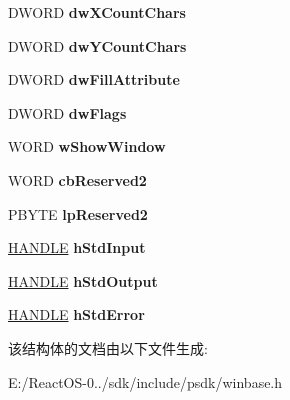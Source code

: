 \begin{DoxyCompactItemize}
\mbox{\label{struct___s_t_a_r_t_u_p_i_n_f_o_a_a339d012760b443363218eb43809c3feb}} 
D\+W\+O\+RD {\bfseries dw\+X\+Count\+Chars}
\item 
\mbox{\label{struct___s_t_a_r_t_u_p_i_n_f_o_a_a8fa7ef82e7b3ec0ef430a8b3e0e966ee}} 
D\+W\+O\+RD {\bfseries dw\+Y\+Count\+Chars}
\item 
\mbox{\label{struct___s_t_a_r_t_u_p_i_n_f_o_a_af7df2cda3673cf5d30e62340d99eb24e}} 
D\+W\+O\+RD {\bfseries dw\+Fill\+Attribute}
\item 
\mbox{\label{struct___s_t_a_r_t_u_p_i_n_f_o_a_a528647d3eb202072f508079f5a5a1cf9}} 
D\+W\+O\+RD {\bfseries dw\+Flags}
\item 
\mbox{\label{struct___s_t_a_r_t_u_p_i_n_f_o_a_a76de742c6711d4965344d1c51a2493fe}} 
W\+O\+RD {\bfseries w\+Show\+Window}
\item 
\mbox{\label{struct___s_t_a_r_t_u_p_i_n_f_o_a_ac437ec76176bbd4daf3ed1aa38c67513}} 
W\+O\+RD {\bfseries cb\+Reserved2}
\item 
\mbox{\label{struct___s_t_a_r_t_u_p_i_n_f_o_a_acaeb538cd6df999d96ba0ad34daf56aa}} 
P\+B\+Y\+TE {\bfseries lp\+Reserved2}
\item 
\mbox{\label{struct___s_t_a_r_t_u_p_i_n_f_o_a_a5da05e6193b79023e31810fc555996ee}} 
\hyperlink{interfacevoid}{H\+A\+N\+D\+LE} {\bfseries h\+Std\+Input}
\item 
\mbox{\label{struct___s_t_a_r_t_u_p_i_n_f_o_a_a1bf79e30bdb79cba86dfd9f54dd9a84a}} 
\hyperlink{interfacevoid}{H\+A\+N\+D\+LE} {\bfseries h\+Std\+Output}
\item 
\mbox{\label{struct___s_t_a_r_t_u_p_i_n_f_o_a_a4fb11840529e4f8b6495b5c0f4b36c13}} 
\hyperlink{interfacevoid}{H\+A\+N\+D\+LE} {\bfseries h\+Std\+Error}
\end{DoxyCompactItemize}


该结构体的文档由以下文件生成\+:\begin{DoxyCompactItemize}
\item 
E\+:/\+React\+O\+S-\/0../sdk/include/psdk/winbase.\+h\end{DoxyCompactItemize}
